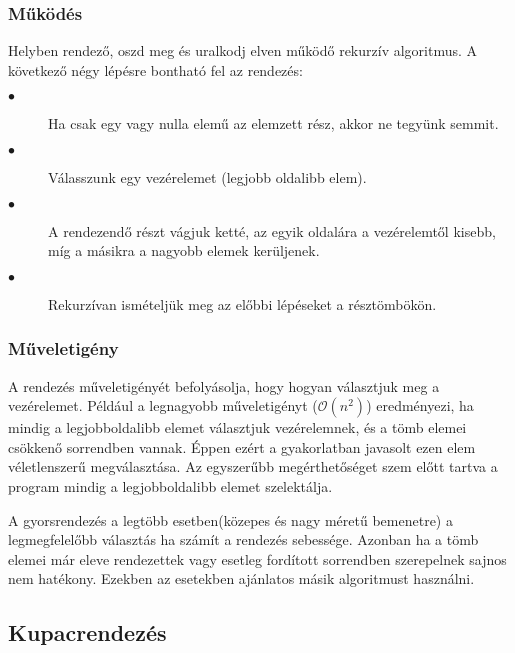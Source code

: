 \documentclass{elteikthesis}
\begin{document}
\subsubsection{Működés}
Helyben rendező, oszd meg és uralkodj\cite{Cormen} elven működő rekurzív algoritmus. A következő négy lépésre bontható fel az rendezés:
\begin{description}
	\item[$\bullet$] Ha csak egy vagy nulla elemű az elemzett rész, akkor ne tegyünk semmit.
	\item[$\bullet$] Válasszunk egy vezérelemet (legjobb oldalibb elem).
	\item[$\bullet$] A rendezendő részt vágjuk ketté, az egyik oldalára a vezérelemtől kisebb, míg a másikra a nagyobb elemek kerüljenek.
	\item[$\bullet$] Rekurzívan ismételjük meg az előbbi lépéseket a résztömbökön.
\end{description}
\subsubsection{Műveletigény}
A rendezés műveletigényét befolyásolja, hogy hogyan választjuk meg a vezérelemet. Például a legnagyobb műveletigényt ($\mathcal{O}(n^2)$) eredményezi, ha mindig a legjobboldalibb elemet választjuk vezérelemnek, és a tömb elemei csökkenő sorrendben vannak\cite{Cormen}. Éppen ezért a gyakorlatban javasolt ezen elem véletlenszerű megválasztása. Az egyszerűbb megérthetőséget szem előtt tartva a program mindig a legjobboldalibb elemet szelektálja.\par
 A gyorsrendezés a legtöbb esetben(közepes és nagy méretű bemenetre) a legmegfelelőbb választás ha számít a rendezés sebessége. Azonban ha a tömb elemei már eleve rendezettek vagy esetleg fordított sorrendben szerepelnek sajnos nem hatékony\cite{Cormen}. Ezekben az esetekben ajánlatos másik algoritmust használni.

\subsection{Kupacrendezés}
\end{document}
